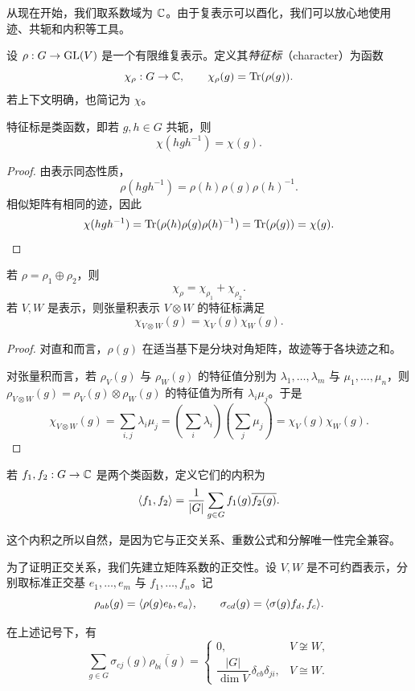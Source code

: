 从现在开始，我们取系数域为 $\mathbb{C}$。由于复表示可以酉化，我们可以放心地使用迹、共轭和内积等工具。

\begin{definition}
设 $\rho:G\to \mathrm{GL}(V)$ 是一个有限维复表示。定义其\emph{特征标}（character）为函数
\[
\chi_\rho:G\to \mathbb{C},\qquad \chi_\rho(g)=\mathrm{Tr}(\rho(g)).
\]
若上下文明确，也简记为 $\chi$。
\end{definition}

\begin{proposition}
特征标是类函数，即若 $g,h\in G$ 共轭，则
\[
\chi(hgh^{-1})=\chi(g).
\]
\end{proposition}

\begin{proof}
由表示同态性质，
\[
\rho(hgh^{-1})=\rho(h)\rho(g)\rho(h)^{-1}.
\]
相似矩阵有相同的迹，因此
\[
\chi(hgh^{-1})=\mathrm{Tr}(\rho(h)\rho(g)\rho(h)^{-1})=\mathrm{Tr}(\rho(g))=\chi(g).
\]
\end{proof}

\begin{proposition}
若 $\rho=\rho_1\oplus \rho_2$，则
\[
\chi_\rho=\chi_{\rho_1}+\chi_{\rho_2}.
\]
若 $V,W$ 是表示，则张量积表示 $V\otimes W$ 的特征标满足
\[
\chi_{V\otimes W}(g)=\chi_V(g)\chi_W(g).
\]
\end{proposition}

\begin{proof}
对直和而言，$\rho(g)$ 在适当基下是分块对角矩阵，故迹等于各块迹之和。

对张量积而言，若 $\rho_V(g)$ 与 $\rho_W(g)$ 的特征值分别为 $\lambda_1,\dots,\lambda_m$ 与 $\mu_1,\dots,\mu_n$，则 $\rho_{V\otimes W}(g)=\rho_V(g)\otimes \rho_W(g)$ 的特征值为所有 $\lambda_i\mu_j$。于是
\[
\chi_{V\otimes W}(g)=\sum_{i,j}\lambda_i\mu_j
=\left(\sum_i\lambda_i\right)\left(\sum_j\mu_j\right)
=\chi_V(g)\chi_W(g).
\]
\end{proof}

\begin{definition}
若 $f_1,f_2:G\to \mathbb{C}$ 是两个类函数，定义它们的内积为
\[
\langle f_1, f_2 \rangle=\frac{1}{|G|}\sum_{g\in G}f_1(g)\overline{f_2(g)}.
\]
\end{definition}

这个内积之所以自然，是因为它与正交关系、重数公式和分解唯一性完全兼容。

为了证明正交关系，我们先建立矩阵系数的正交性。设 $V,W$ 是不可约酉表示，分别取标准正交基 $e_1,\dots,e_m$ 与 $f_1,\dots,f_n$。记
\[
\rho_{ab}(g)=\langle \rho(g)e_b, e_a \rangle,\qquad
\sigma_{cd}(g)=\langle \sigma(g)f_d, f_c \rangle.
\]

\begin{lemma}[矩阵系数正交关系]
在上述记号下，有
\[
\sum_{g\in G}\sigma_{cj}(g)\overline{\rho_{bi}(g)}=
\begin{cases}
0, & V\not\cong W,\\[4pt]
\dfrac{|G|}{\dim V}\,\delta_{cb}\delta_{ji}, & V\cong W.
\end{cases}
\]
\end{lemma}

